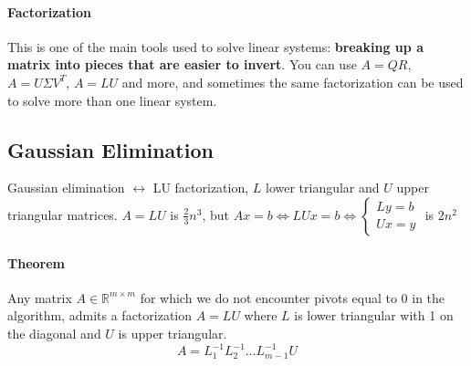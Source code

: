 \documentclass[10pt]{report}
\begin{document}
\paragraph{Factorization} This is one of the main tools used to solve linear systems: \textbf{breaking up a matrix into pieces that are easier to invert}. You can use $A=QR$, $A=U\Sigma V^T$, $A=LU$ and more, and sometimes the same factorization can be used to solve more than one linear system.
\subsection{Gaussian Elimination}
Gaussian elimination $\leftrightarrow$ LU factorization, $L$ lower triangular and $U$ upper triangular matrices. $A = LU$ is $\frac{2}{3}n^3$, but $Ax=b\Leftrightarrow LUx = b\Leftrightarrow\left\{\begin{array}{l}
Ly=b\\Ux=y
\end{array}\right.$ is $2n^2$
\paragraph{Theorem} Any matrix $A\in\mathbb{R}^{m\times m}$ for which we do not encounter pivots equal to 0 in the algorithm, admits a factorization $A=LU$ where $L$ is lower triangular with 1 on the diagonal and $U$ is upper triangular.
$$A = L_1^{-1}L_2^{-1}\ldots L_{m-1}^{-1}U$$
\end{document}
